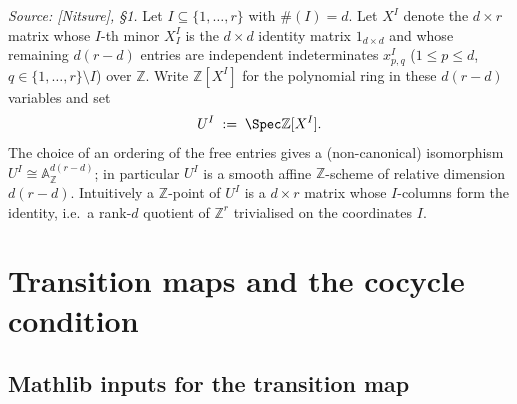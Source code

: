 \begin{definition}

  \label{def:gr_affine_chart}
  \textit{Source: [Nitsure], \S 1.}
  Let \(I \subseteq \{1, \dots, r\}\) with \(\#(I) = d\). Let \(X^I\) denote the
  \(d \times r\) matrix whose \(I\)-th minor \(X^I_I\) is the \(d \times d\)
  identity matrix \(1_{d \times d}\) and whose remaining \(d(r - d)\) entries are
  independent indeterminates \(x^I_{p,q}\) (\(1 \le p \le d\),
  \(q \in \{1,\dots,r\} \setminus I\)) over \(\mathbb{Z}\). Write
  \(\mathbb{Z}[X^I]\) for the polynomial ring in these \(d(r-d)\) variables and
  set
  \[
    U^I \;:=\; \Spec \mathbb{Z}[X^I].
  \]
  The choice of an ordering of the free entries gives a (non-canonical)
  isomorphism \(U^I \cong \mathbb{A}^{d(r-d)}_{\mathbb{Z}}\); in particular
  \(U^I\) is a smooth affine \(\mathbb{Z}\)-scheme of relative dimension
  \(d(r-d)\). Intuitively a \(\mathbb{Z}\)-point of \(U^I\) is a \(d \times r\)
  matrix whose \(I\)-columns form the identity, i.e.\ a rank-\(d\) quotient of
  \(\mathbb{Z}^{r}\) trivialised on the coordinates \(I\).
\end{definition}

\section{Transition maps and the cocycle condition}
\label{sec:gr_transition}

\subsection*{Mathlib inputs for the transition map}

